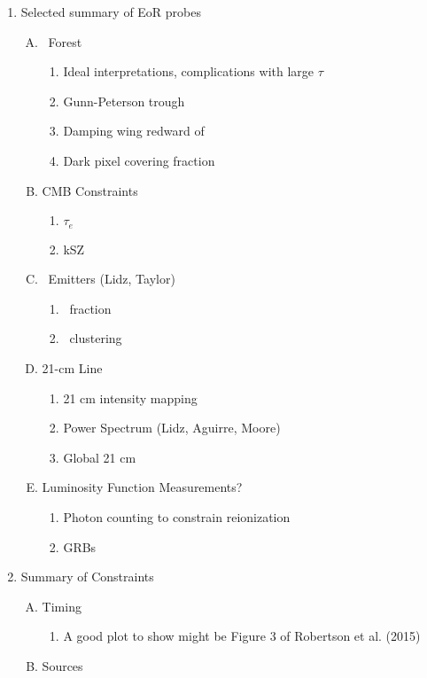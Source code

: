 \documentclass[11pt]{article}
\begin{document}
\begin{enumerate}
\begin{enumerate}[1.]
\item Selected summary of EoR probes
\begin{enumerate}[A.]
\item \lya\ Forest
\begin{enumerate}[$\to$]
\item Ideal interpretations, complications with large $\tau$
\item Gunn-Peterson trough
\item Damping wing redward of \lya
\item Dark pixel covering fraction
\end{enumerate}
\item CMB Constraints
\begin{enumerate}[$\to$]
\item $\tau_{e}$
\item kSZ
\end{enumerate}
\item \lya\ Emitters (Lidz, Taylor)
\begin{enumerate}[$\to$]
\item \lya\ fraction
\item \lya\ clustering
\end{enumerate}
\item 21-cm Line
\begin{enumerate}[$\to$]
\item 21 cm intensity mapping
\item Power Spectrum (Lidz, Aguirre, Moore)
\item Global 21 cm
\end{enumerate}
\item Luminosity Function Measurements?
\begin{enumerate}[$\to$]
\item Photon counting to constrain reionization
\item GRBs
\end{enumerate}
\end{enumerate}
\item Summary of Constraints
\begin{enumerate}[A.]
\item Timing
\begin{enumerate}[$\to$]
\item A good plot to show might be Figure 3 of Robertson et al. (2015)
\end{enumerate}
\item Sources

\end{enumerate}
\end{enumerate}
\end{enumerate}
\end{document}
